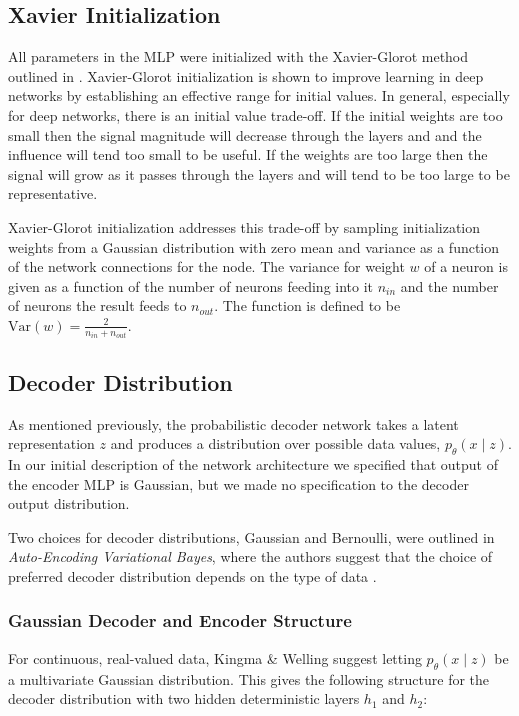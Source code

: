 \documentclass{article} %
\numberwithin{figure}{section}
\begin{document}
\subsection{Xavier Initialization}
All parameters in the MLP were initialized with the Xavier-Glorot method outlined in \cite{Glorot2010}. Xavier-Glorot initialization is shown to improve learning in deep networks by establishing an effective range for initial values. In general, especially for deep networks, there is an initial value trade-off. If the initial weights are too small then the signal magnitude will decrease through the layers and and the influence will tend too small to be useful. If the weights are too large then the signal will grow as it passes through the layers and will tend to be too large to be representative.
\par Xavier-Glorot initialization addresses this trade-off by sampling initialization weights from a Gaussian distribution with zero mean and variance as a function of the network connections for the node. The variance for weight $w$  of a neuron is given as a function of the number of neurons feeding into it $n_{in}$ and the number of neurons the result feeds to $n_{out}$. The function is defined to be $\text{Var}(w) = \frac{2}{n_{in}+n_{out}}$.


\subsection{Decoder Distribution}

As mentioned previously, the probabilistic decoder network takes a latent representation $z$ and produces a distribution over possible data values, ${p_\theta(x\mid z)}$. In our initial description of the network architecture we specified that output of the encoder MLP is Gaussian, but we made no specification to the decoder output distribution.
\par Two choices for decoder distributions, Gaussian and Bernoulli, were outlined in \textit{Auto-Encoding Variational Bayes}, where the authors suggest that the choice of preferred decoder distribution depends on the type of data \cite{Kingma2013}. 

\subsubsection{Gaussian Decoder and Encoder Structure}
For continuous, real-valued data, Kingma \& Welling suggest letting ${p_\theta(x\mid z)}$ be a multivariate Gaussian distribution. This gives the following structure for the decoder distribution with two hidden deterministic layers $h_1$ and $h_2$:
\end{document}
